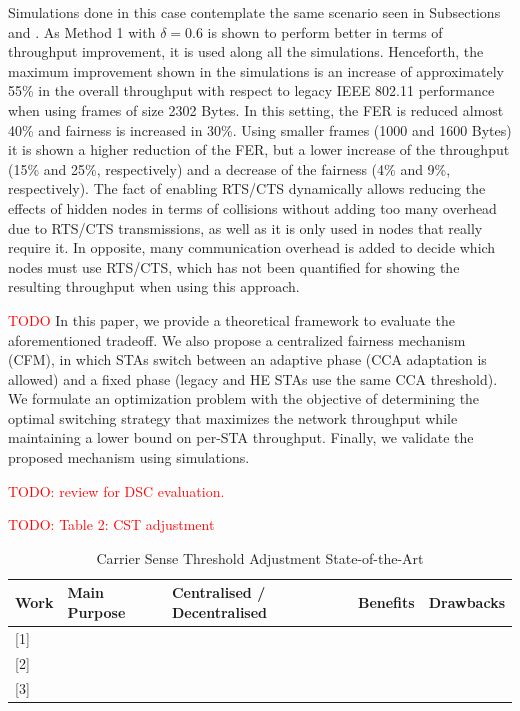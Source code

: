 \documentclass[12pt, a4paper,twoside]{tesi_upf}
\begin{document}
			Simulations done in this case contemplate the same scenario seen in Subsections \cite{afaqui2015evaluation} and \cite{afaqui2016dynamic}. As Method 1 with $\delta = 0.6$ is shown to perform better in terms of throughput improvement, it is used along all the simulations. Henceforth, the maximum improvement shown in the simulations is an increase of approximately 55\% in the overall throughput with respect to legacy IEEE 802.11 performance when using frames of size 2302 Bytes. In this setting, the FER is reduced almost 40\% and fairness is increased in 30\%. Using smaller frames (1000 and 1600 Bytes) it is shown a higher reduction of the FER, but a lower increase of the throughput (15\% and 25\%, respectively) and a decrease of the fairness (4\% and 9\%, respectively).	The fact of enabling RTS/CTS dynamically allows reducing the effects of hidden nodes in terms of collisions without adding too many overhead due to RTS/CTS transmissions, as well as it is only used in nodes that really require it. In opposite, many communication overhead is added to decide which nodes must use RTS/CTS, which has not been quantified for showing the resulting throughput when using this approach.
	
			
			\cite{afifi2016throughput} \textcolor{red}{TODO} In this paper, we provide a theoretical framework to evaluate the aforementioned tradeoff. We also propose a centralized fairness mechanism (CFM), in which STAs switch between an adaptive phase (CCA adaptation is allowed) and a fixed phase (legacy and HE STAs use the same CCA threshold). We formulate an optimization problem with the objective of determining the optimal switching strategy that maximizes the network throughput while maintaining a lower bound on per-STA throughput. Finally, we validate the proposed mechanism using simulations.		
			
			
			
			
			\textcolor{red}{TODO: review \cite{selinis2016evaluation, zhong2016promise, kulkarni2015taming} for DSC evaluation.}
	
	
	
			\textcolor{red}{TODO: Table 2: CST adjustment}
			\begin{table}[h!]
				\centering
				\begin{tabular}{|l|l|l|l|l|}
					\hline
					\textbf{Work} & \textbf{Main Purpose} & \textbf{Centralised / Decentralised} & \textbf{Benefits} & \textbf{Drawbacks} \\ \hline
					{[}1{]} &  &  &  &  \\ \hline
					{[}2{]} &  &  &  &  \\ \hline
					{[}3{]} &  &  &  &  \\ \hline
				\end{tabular}
				\caption{Carrier Sense Threshold Adjustment State-of-the-Art}
				\label{tbl:cca}
			\end{table}
		
\end{document}
